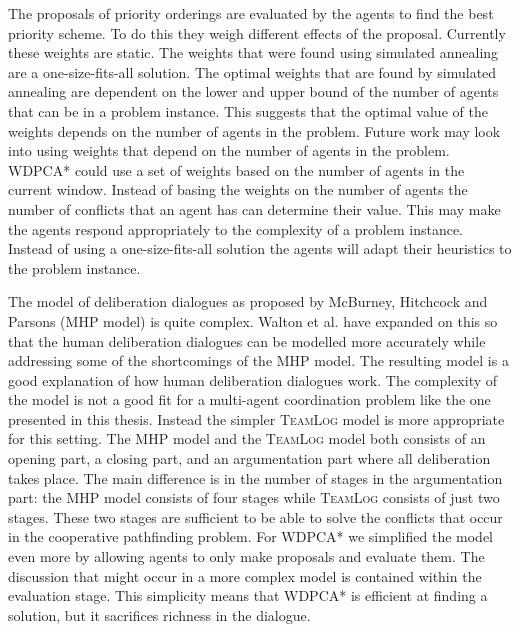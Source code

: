 The proposals of priority orderings are evaluated by the agents to find the
best priority scheme. To do this they weigh different effects of the proposal.
Currently these weights are static. The weights that were found using simulated
annealing are a one-size-fits-all solution. The optimal weights that are found
by simulated annealing are dependent on the lower and upper bound of the number
of agents that can be in a problem instance. This suggests that the optimal
value of the weights depends on the number of agents in the problem. Future
work may look into using weights that depend on the number of agents in the
problem. WDPCA* could use a set of weights based on the number of agents in the
current window. Instead of basing the weights on the number of agents the
number of conflicts that an agent has can determine their value. This may make
the agents respond appropriately to the complexity of a problem instance.
Instead of using a one-size-fits-all solution the agents will adapt their
heuristics to the problem instance.


The model of deliberation dialogues as proposed by McBurney, Hitchcock and
Parsons (MHP model) \cite{mcburney2007} is quite complex. Walton et al.
\cite{walton2014} have expanded on this so that the human deliberation
dialogues can be modelled more accurately while addressing some of the
shortcomings of the MHP model. The resulting model is a good explanation of how 
human deliberation dialogues work. The complexity of the model is not a good 
fit for a multi-agent coordination problem like the one presented in this 
thesis. Instead the simpler \textsc{TeamLog} model \cite{dunin-keplicz2011} is 
more appropriate for this setting. The MHP model and the \textsc{TeamLog} model 
both consists of an opening part, a closing part, and an argumentation part 
where all deliberation takes place. The main difference is in the number of 
stages in the argumentation part: the MHP model consists of four stages while 
\textsc{TeamLog} consists of just two stages. These two stages are sufficient 
to be able to solve the conflicts that occur in the cooperative pathfinding 
problem. For WDPCA* we simplified the model even more by allowing agents to 
only make proposals and evaluate them. The discussion that might occur in a 
more complex model is contained within the evaluation stage. This simplicity 
means that WDPCA* is efficient at finding a solution, but it sacrifices 
richness in the dialogue.


